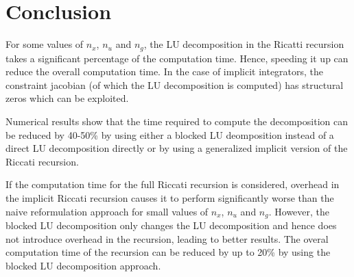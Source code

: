 \documentclass{article}
\begin{document}
\section{Conclusion}
For some values of $n_x$, $n_u$ and $n_g$, the LU decomposition in the Ricatti recursion takes a significant percentage of the computation time. Hence, speeding it up can reduce the overall computation time. In the case of implicit integrators, the constraint jacobian (of which the LU decomposition is computed) has structural zeros which can be exploited.

Numerical results show that the time required to compute the decomposition can be reduced by 40-50\% by using either a blocked LU deomposition instead of a direct LU decomposition directly or by using a generalized implicit version of the Riccati recursion. 

If the computation time for the full Riccati recursion is considered, overhead in the implicit Riccati recursion causes it to perform significantly worse than the naive reformulation approach for small values of $n_x$, $n_u$ and $n_g$. However, the blocked LU decomposition only changes the LU decomposition and hence does not introduce overhead in the recursion, leading to better results. The overal computation time of the recursion can be reduced by up to 20\% by using the blocked LU decomposition approach.
\end{document}
